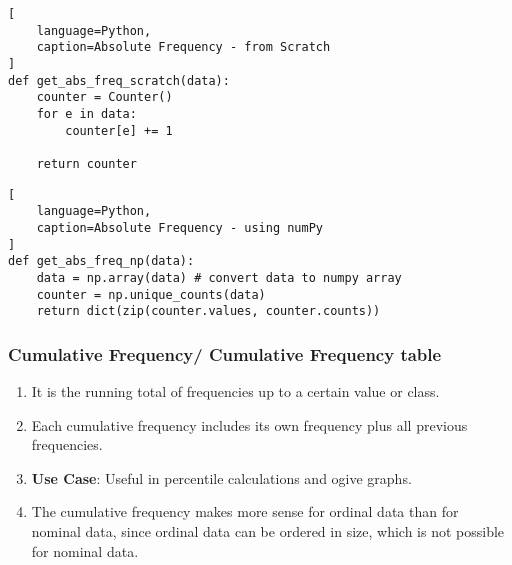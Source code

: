 \begin{lstlisting}[
    language=Python,
    caption=Absolute Frequency - from Scratch
]
def get_abs_freq_scratch(data):
    counter = Counter()
    for e in data:
        counter[e] += 1

    return counter
\end{lstlisting}

\begin{lstlisting}[
    language=Python,
    caption=Absolute Frequency - using numPy
]
def get_abs_freq_np(data):
    data = np.array(data) # convert data to numpy array
    counter = np.unique_counts(data)
    return dict(zip(counter.values, counter.counts))
\end{lstlisting}

\subsubsection{Cumulative Frequency/ Cumulative Frequency table \cite{statistics/book/Statistics-for-Data-Scientists/Maurits-Kaptein}}\label{Data/Describing Data/Frequency or Frequency table/Cumulative}

\begin{enumerate}
    \item It is the running total of frequencies up to a certain value or class. \hfill \cite{common/online/chatgpt}

    \item Each cumulative frequency includes its own frequency plus all previous frequencies. \hfill \cite{common/online/chatgpt}

    \item \textbf{Use Case}: Useful in percentile calculations and ogive graphs. \hfill \cite{common/online/chatgpt}

    \item The cumulative frequency makes more sense for ordinal data than for nominal data, since ordinal data can be ordered in size, which is not possible for nominal data. \hfill \cite{statistics/book/Statistics-for-Data-Scientists/Maurits-Kaptein}
\end{enumerate}

